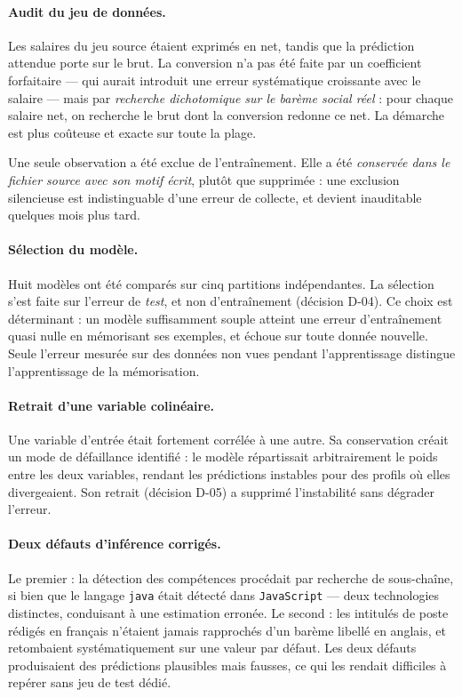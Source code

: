 \paragraph{Audit du jeu de données.} Les salaires du jeu source étaient
exprimés en net, tandis que la prédiction attendue porte sur le brut. La
conversion n'a pas été faite par un coefficient forfaitaire — qui aurait
introduit une erreur systématique croissante avec le salaire — mais par
\emph{recherche dichotomique sur le barème social réel} : pour chaque salaire
net, on recherche le brut dont la conversion redonne ce net. La démarche est
plus coûteuse et exacte sur toute la plage.

Une seule observation a été exclue de l'entraînement. Elle a été
\emph{conservée dans le fichier source avec son motif écrit}, plutôt que
supprimée : une exclusion silencieuse est indistinguable d'une erreur de
collecte, et devient inauditable quelques mois plus tard.

\paragraph{Sélection du modèle.} Huit modèles ont été comparés sur cinq
partitions indépendantes. La sélection s'est faite sur l'erreur de \emph{test},
et non d'entraînement (décision D-04). Ce choix est déterminant : un modèle
suffisamment souple atteint une erreur d'entraînement quasi nulle en mémorisant
ses exemples, et échoue sur toute donnée nouvelle. Seule l'erreur mesurée sur
des données non vues pendant l'apprentissage distingue l'apprentissage de la
mémorisation.

\paragraph{Retrait d'une variable colinéaire.} Une variable d'entrée était
fortement corrélée à une autre. Sa conservation créait un mode de défaillance
identifié : le modèle répartissait arbitrairement le poids entre les deux
variables, rendant les prédictions instables pour des profils où elles
divergeaient. Son retrait (décision D-05) a supprimé l'instabilité sans dégrader
l'erreur.

\paragraph{Deux défauts d'inférence corrigés.} Le premier : la détection des
compétences procédait par recherche de sous-chaîne, si bien que le langage
\texttt{java} était détecté dans \texttt{JavaScript} — deux technologies
distinctes, conduisant à une estimation erronée. Le second : les intitulés de
poste rédigés en français n'étaient jamais rapprochés d'un barème libellé en
anglais, et retombaient systématiquement sur une valeur par défaut. Les deux
défauts produisaient des prédictions plausibles mais fausses, ce qui les rendait
difficiles à repérer sans jeu de test dédié.

